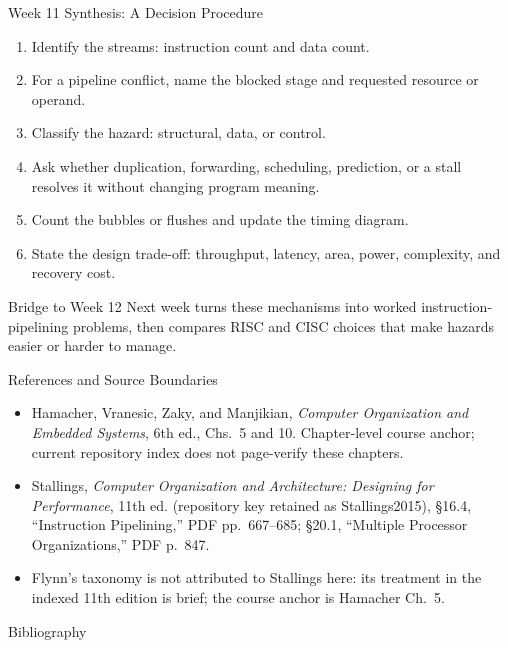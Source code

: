 \documentclass[aspectratio=169]{beamer}
\begin{document}
\begin{frame}{Week 11 Synthesis: A Decision Procedure}
  \begin{enumerate}
    \item Identify the streams: instruction count and data count.
    \item For a pipeline conflict, name the blocked stage and requested resource
      or operand.
    \item Classify the hazard: structural, data, or control.
    \item Ask whether duplication, forwarding, scheduling, prediction, or a
      stall resolves it without changing program meaning.
    \item Count the bubbles or flushes and update the timing diagram.
    \item State the design trade-off: throughput, latency, area, power,
      complexity, and recovery cost.
  \end{enumerate}
  \begin{block}{Bridge to Week 12}
    Next week turns these mechanisms into worked instruction-pipelining
    problems, then compares RISC and CISC choices that make hazards easier or
    harder to manage.
  \end{block}
\end{frame}

\begin{frame}{References and Source Boundaries}
  \small
  \begin{itemize}
    \item Hamacher, Vranesic, Zaky, and Manjikian, \emph{Computer Organization
      and Embedded Systems}, 6th ed., Chs.~5 and 10. Chapter-level course
      anchor; current repository index does not page-verify these chapters.
    \item Stallings, \emph{Computer Organization and Architecture: Designing
      for Performance}, 11th ed. (repository key retained as Stallings2015),
      \S16.4, ``Instruction Pipelining,'' PDF pp.~667--685; \S20.1,
      ``Multiple Processor Organizations,'' PDF p.~847.
    \item Flynn's taxonomy is not attributed to Stallings here: its treatment
      in the indexed 11th edition is brief; the course anchor is Hamacher Ch.~5.
  \end{itemize}
  \vspace{0.2cm}
\end{frame}

\begin{frame}[allowframebreaks]{Bibliography}
  
  
\end{frame}
\end{document}
